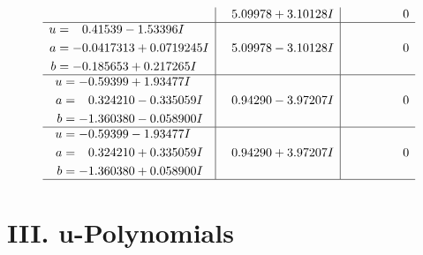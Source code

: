 \documentclass[1p]{elsarticle_modified}
\theoremstyle{definition}
\begin{document}
$$\begin{array}{c|c|c}
 & \phantom{-}5.09978 + 3.10128 I & \phantom{-0.000000 } 0 \\ \hline\begin{aligned}
u &= \phantom{-}0.41539 - 1.53396 I \\
a &= -0.0417313 + 0.0719245 I \\
b &= -0.185653 + 0.217265 I\end{aligned}
 & \phantom{-}5.09978 - 3.10128 I & \phantom{-0.000000 } 0 \\ \hline\begin{aligned}
u &= -0.59399 + 1.93477 I \\
a &= \phantom{-}0.324210 - 0.335059 I \\
b &= -1.360380 - 0.058900 I\end{aligned}
 & \phantom{-}0.94290 - 3.97207 I & \phantom{-0.000000 } 0 \\ \hline\begin{aligned}
u &= -0.59399 - 1.93477 I \\
a &= \phantom{-}0.324210 + 0.335059 I \\
b &= -1.360380 + 0.058900 I\end{aligned}
 & \phantom{-}0.94290 + 3.97207 I & \phantom{-0.000000 } 0\\
 \hline 
 \end{array}$$\newpage
\newpage\renewcommand{\arraystretch}{1}
\centering \section*{ III. u-Polynomials}
\end{document}
